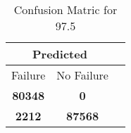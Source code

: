 \begin{table}[] 
\caption{Confusion Matric for 97.5} 
\label{Table: Prediction Accuracy-DMD97.5OnlySunEKF-ignoreReflectionperfectNoFailurePrediction-Reflection} 
\centering 
\begin{tabular} 
 {@{}ccc@{}} 
\toprule 
\multicolumn{2}{c}{\textbf{Predicted}}
 \\ \midrule 
\multicolumn{1}{|c|}{Failure} & 
\multicolumn{1}{c|}{No Failure}
 \\ \midrule 
\multicolumn{1}{|c|}{\color{green}\textbf{80348}} & 
\multicolumn{1}{c|}{\color{red}\textbf{0}}
 \\ \midrule 
\multicolumn{1}{|c|}{\color{red}\textbf{2212}} & 
\multicolumn{1}{c|}{\color{green}\textbf{87568}}
 \\ \bottomrule 
\end{tabular} 
\end{table} 
